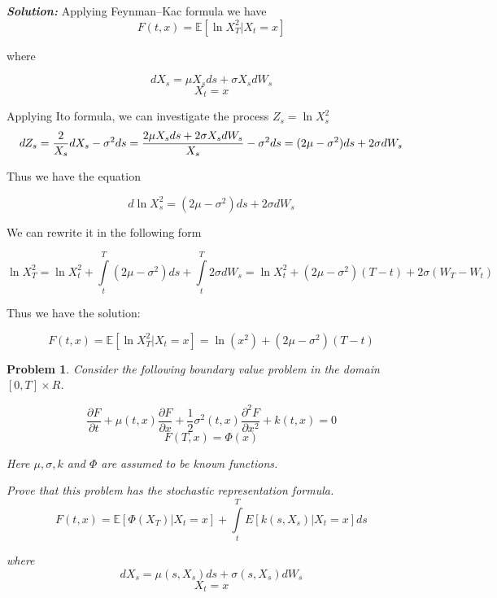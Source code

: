 \documentclass[a4paper, 12pt]{article}
\theoremstyle{problemstyle}
\newtheorem{problem}{Problem}[section]
\newenvironment{solution}
{\textit{\textbf{Solution:}}}
{}
\newcommand{\E}{\mathbb{E}}
\begin{document}
\begin{solution}
    Applying Feynman–Kac formula we have
$$
F(t,x) = \E[\ln X_T^2| X_t = x]
$$

where

$$
dX_s = \mu X_s ds + \sigma X_s dW_s
$$
$$
X_t = x
$$

Applying Ito formula, we can investigate the process $Z_s = \ln X_s^2$
$$
d Z_s = \frac{2}{X_s}dX_s - \sigma^2 ds = \frac{2\mu X_s ds + 2 \sigma X_s dW_s}{X_s} - \sigma^2 ds = (2\mu - \sigma^2)ds + 2\sigma dW_s\\
$$

Thus we have the equation

$$
d \ln X^2_s = (2\mu - \sigma^2)ds + 2\sigma dW_s
$$

We can rewrite it in the following form

$$
\ln X_T^2= \ln X_t^2 + \int\limits_t^T (2\mu - \sigma^2) ds + \int\limits_{t}^{T}2\sigma dW_s = \ln X_t^2 + (2\mu - \sigma^2) (T-t) + 2\sigma (W_T - W_t)
$$

Thus we have the solution:

$$
F(t,x) = \E[\ln X_T^2| X_t = x] = \ln(x^2) + (2\mu - \sigma^2) (T-t)
$$
\end{solution}

\begin{problem}
Consider the following boundary value problem in the domain
$[0,T] \times R$.

$$ 
\frac{\partial F}{\partial t} + \mu(t,x) \frac{\partial F}{\partial x} + \frac{1}{2}\sigma^2(t,x) \frac{\partial^2 F}{\partial x^2} + k(t,x) = 0
$$
$$
F(T,x) = \Phi(x)
$$

Here $\mu, \sigma, k$ and $\Phi$ are assumed to be known functions.

Prove that this problem has the stochastic representation formula.
$$
F(t, x) = \E[\Phi(X_T)| X_t = x] + \int\limits_t^T E[k(s, X_s)|X_t = x]ds
$$

where 
$$
dX_s = \mu(s, X_s) ds + \sigma(s, X_s) dW_s
$$
$$
X_t = x
$$
\end{problem}
\end{document}
